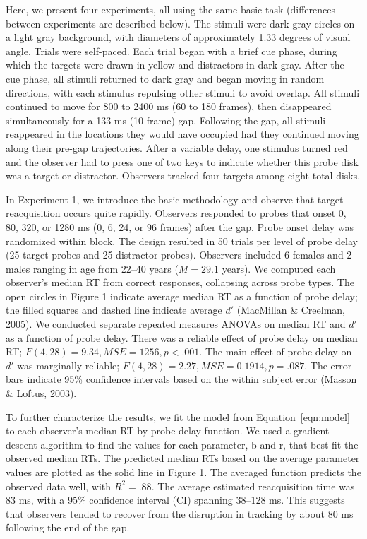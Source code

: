 \documentclass[man,nobf]{apa}
\newcommand{\MSE}{\ensuremath{\mathit{MSE}}}
\begin{document}
Here, we present four experiments, all using the same basic task
(differences between experiments are described below).  The stimuli were
dark gray circles on a light gray background, with diameters of
approximately 1.33 degrees of visual angle.  Trials were self-paced.  Each
trial began with a brief cue phase, during which the targets were drawn in
yellow and distractors in dark gray.  After the cue phase, all stimuli
returned to dark gray and began moving in random directions, with each
stimulus repulsing other stimuli to avoid overlap.  All stimuli continued
to move for 800 to 2400 ms (60 to 180 frames), then disappeared
simultaneously for a 133 ms (10 frame) gap.  Following the gap, all stimuli
reappeared in the locations they would have occupied had they continued
moving along their pre-gap trajectories.  After a variable delay, one
stimulus turned red and the observer had to press one of two keys to
indicate whether this probe disk was a target or distractor.  Observers
tracked four targets among eight total disks.

In Experiment 1, we introduce the basic methodology and observe that target
reacquisition occurs quite rapidly.  Observers responded to probes that
onset 0, 80, 320, or 1280 ms (0, 6, 24, or 96 frames) after the gap.  Probe
onset delay was randomized within block.  The design resulted in 50 trials
per level of probe delay (25 target probes and 25 distractor probes).
Observers included 6 females and 2 males ranging in age from 22--40 years
($M = 29.1$ years).  We computed each observer's median RT from correct
responses, collapsing across probe types.  The open circles in Figure 1
indicate average median RT as a function of probe delay; the filled squares
and dashed line indicate average $d'$ (MacMillan \& Creelman, 2005).  We
conducted separate repeated measures ANOVAs on median RT and $d'$ as a
function of probe delay.  There was a reliable effect of probe delay on
median RT; $F(4,28) = 9.34, \MSE = 1256, p < .001$.  The main effect of
probe delay on $d'$ was marginally reliable; $F(4, 28) = 2.27, \MSE =
0.1914, p = .087$.  The error bars indicate 95\% confidence intervals based
on the within subject error (Masson \& Loftus, 2003).

To further characterize the results, we fit the model from
Equation~\ref{eqn:model} to each observer's median RT by probe delay
function.  We used a gradient descent algorithm to find the values for each
parameter, b and r, that best fit the observed median RTs.  The predicted
median RTs based on the average parameter values are plotted as the solid
line in Figure 1.  The averaged function predicts the observed data well,
with $R^2 = .88$.  The average estimated reacquisition time was 83 ms, with
a 95\% confidence interval (CI) spanning 38--128 ms.  This suggests that
observers tended to recover from the disruption in tracking by about 80 ms
following the end of the gap.
\end{document}
